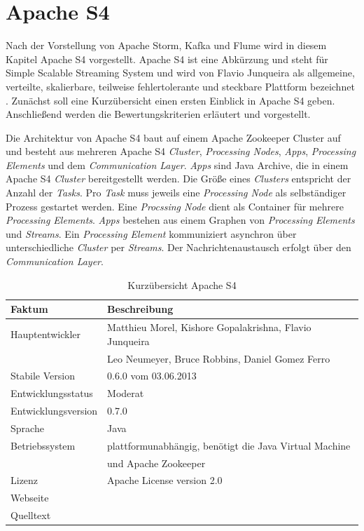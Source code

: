 \section{Apache S4}


Nach der Vorstellung von Apache Storm, Kafka und Flume wird in diesem Kapitel Apache S4 vorgestellt. Apache S4 ist eine Abkürzung und steht für Simple Scalable Streaming System und wird von Flavio Junqueira als allgemeine, verteilte, skalierbare, teilweise fehlertolerante und steckbare Plattform bezeichnet . Zunächst soll eine Kurzübersicht einen ersten Einblick in Apache S4 geben. Anschließend werden die Bewertungskriterien erläutert und vorgestellt.

Die Architektur von Apache S4 baut auf einem Apache Zookeeper Cluster auf und besteht aus mehreren Apache S4 \textit{Cluster}, \textit{Processing Nodes}, \textit{Apps}, \textit{Processing Elements} und dem \textit{Communication Layer}. \textit{Apps} sind Java Archive, die in einem Apache S4 \textit{Cluster} bereitgestellt werden. Die Größe eines \textit{Clusters} entspricht der Anzahl der \textit{Tasks}. Pro \textit{Task} muss jeweils eine \textit{Processing Node} als selbständiger Prozess gestartet werden. Eine \textit{Procssing Node} dient als Container für mehrere \textit{Processing Elements}. \textit{Apps} bestehen aus einem Graphen von \textit{Processing Elements} und \textit{Streams}. Ein \textit{Processing Element} kommuniziert asynchron über unterschiedliche \textit{Cluster} per \textit{Streams}. Der Nachrichtenaustausch erfolgt über den \textit{Communication Layer}. 

\begin{table}[tbp]
	\centering
		\begin{tabular}{@{}ll@{}} \toprule
			\textbf{Faktum} & \textbf{Beschreibung} \\ \midrule
			Hauptentwickler & Matthieu Morel, Kishore Gopalakrishna, Flavio Junqueira \\
			& Leo Neumeyer, Bruce Robbins, Daniel Gomez Ferro \\
			Stabile Version & 0.6.0 vom 03.06.2013 \\ 
			Entwicklungsstatus &  Moderat \\
			Entwicklungsversion & 0.7.0 \\
			Sprache & Java \\
			Betriebssystem & plattformunabhängig, benötigt die Java Virtual Machine \\
			& und Apache Zookeeper \\
			Lizenz & Apache License version 2.0 \\
			Webseite & \citeint{s4:home} \\
			Quelltext & \citeint{s4:GitHubApacheMirror} \\			
			\bottomrule			
		\end{tabular}
	\caption{Kurzübersicht Apache S4}
	\label{tab:vors4}
\end{table}

